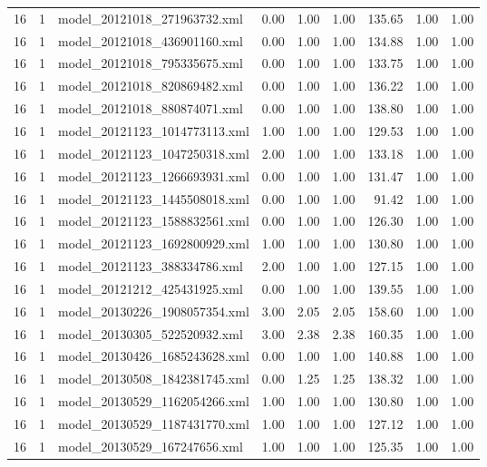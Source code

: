 \begin{table}[ht]
\begin{tabular}{rrlrrrrrr}
   16 &   1 & model\_20121018\_271963732.xml & 0.00 & 1.00 & 1.00 & 135.65 & 1.00 & 1.00 \\ 
   16 &   1 & model\_20121018\_436901160.xml & 0.00 & 1.00 & 1.00 & 134.88 & 1.00 & 1.00 \\ 
   16 &   1 & model\_20121018\_795335675.xml & 0.00 & 1.00 & 1.00 & 133.75 & 1.00 & 1.00 \\ 
   16 &   1 & model\_20121018\_820869482.xml & 0.00 & 1.00 & 1.00 & 136.22 & 1.00 & 1.00 \\ 
   16 &   1 & model\_20121018\_880874071.xml & 0.00 & 1.00 & 1.00 & 138.80 & 1.00 & 1.00 \\ 
   16 &   1 & model\_20121123\_1014773113.xml & 1.00 & 1.00 & 1.00 & 129.53 & 1.00 & 1.00 \\ 
   16 &   1 & model\_20121123\_1047250318.xml & 2.00 & 1.00 & 1.00 & 133.18 & 1.00 & 1.00 \\ 
   16 &   1 & model\_20121123\_1266693931.xml & 0.00 & 1.00 & 1.00 & 131.47 & 1.00 & 1.00 \\ 
   16 &   1 & model\_20121123\_1445508018.xml & 0.00 & 1.00 & 1.00 & 91.42 & 1.00 & 1.00 \\ 
   16 &   1 & model\_20121123\_1588832561.xml & 0.00 & 1.00 & 1.00 & 126.30 & 1.00 & 1.00 \\ 
   16 &   1 & model\_20121123\_1692800929.xml & 1.00 & 1.00 & 1.00 & 130.80 & 1.00 & 1.00 \\ 
   16 &   1 & model\_20121123\_388334786.xml & 2.00 & 1.00 & 1.00 & 127.15 & 1.00 & 1.00 \\ 
   16 &   1 & model\_20121212\_425431925.xml & 0.00 & 1.00 & 1.00 & 139.55 & 1.00 & 1.00 \\ 
   16 &   1 & model\_20130226\_1908057354.xml & 3.00 & 2.05 & 2.05 & 158.60 & 1.00 & 1.00 \\ 
   16 &   1 & model\_20130305\_522520932.xml & 3.00 & 2.38 & 2.38 & 160.35 & 1.00 & 1.00 \\ 
   16 &   1 & model\_20130426\_1685243628.xml & 0.00 & 1.00 & 1.00 & 140.88 & 1.00 & 1.00 \\ 
   16 &   1 & model\_20130508\_1842381745.xml & 0.00 & 1.25 & 1.25 & 138.32 & 1.00 & 1.00 \\ 
   16 &   1 & model\_20130529\_1162054266.xml & 1.00 & 1.00 & 1.00 & 130.80 & 1.00 & 1.00 \\ 
   16 &   1 & model\_20130529\_1187431770.xml & 1.00 & 1.00 & 1.00 & 127.12 & 1.00 & 1.00 \\ 
   16 &   1 & model\_20130529\_167247656.xml & 1.00 & 1.00 & 1.00 & 125.35 & 1.00 & 1.00 \\ 

\end{tabular}
\end{table}
